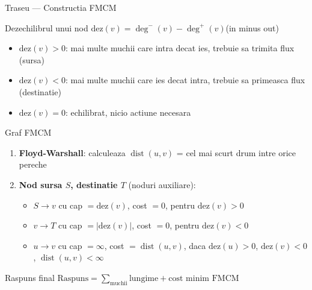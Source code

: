 ﻿\documentclass[9pt]{beamer}
\newcommand{\dist}{\operatorname{dist}}
\begin{document}
\begin{frame}[shrink]{Traseu --- Constructia FMCM}
  \begin{block}{Dezechilibrul unui nod}
    $\text{dez}(v) = \deg^-(v) - \deg^+(v)$\quad (in minus out)
    \begin{itemize}
      \item $\text{dez}(v) > 0$: mai multe muchii care intra decat ies, trebuie sa trimita flux (sursa)
      \item $\text{dez}(v) < 0$: mai multe muchii care ies decat intra, trebuie sa primeasca flux (destinatie)
      \item $\text{dez}(v) = 0$: echilibrat, nicio actiune necesara
    \end{itemize}
  \end{block}
  \begin{block}{Graf FMCM}
    \begin{enumerate}
      \item \textbf{Floyd-Warshall}: calculeaza $\dist(u,v)$ = cel mai scurt drum intre orice pereche
      \item \textbf{Nod sursa $S$, destinatie $T$} (noduri auxiliare):
        \begin{itemize}\footnotesize
          \item $S \to v$ cu cap $= \text{dez}(v)$, cost $= 0$, pentru $\text{dez}(v)>0$
          \item $v \to T$ cu cap $= |\text{dez}(v)|$, cost $= 0$, pentru $\text{dez}(v)<0$
          \item $u \to v$ cu cap $= \infty$, cost $= \dist(u,v)$,
                daca $\text{dez}(u)>0$, $\text{dez}(v)<0$, $\dist(u,v)<\infty$
        \end{itemize}
    \end{enumerate}
  \end{block}
  \begin{alertblock}{Raspuns final}
    \footnotesize
    $\text{Raspuns} = \sum_{\text{muchii}} \text{lungime} + \text{cost minim FMCM}$
  \end{alertblock}
\end{frame}
\end{document}
